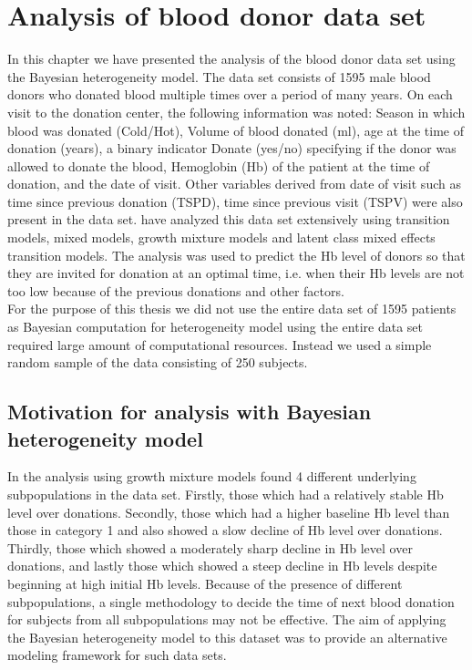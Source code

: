 
\chapter{Analysis of blood donor data set}
\label{ch : blood_donor}
 
 In this chapter we have presented the analysis of the blood donor data set \citep{nasserinejad_prevalence_2015} using the Bayesian heterogeneity model. The data set consists of 1595 male blood donors who donated blood multiple times over a period of many years. On each visit to the donation center, the following information was noted: Season in which blood was donated (Cold/Hot), Volume of blood donated (ml), age at the time of donation (years), a binary indicator Donate (yes/no) specifying if the donor was allowed to donate the blood, Hemoglobin (Hb) of the patient at the time of donation, and the date of visit. Other variables derived from date of visit such as time since previous donation (TSPD), time since previous visit (TSPV) were also present in the data set. \citet{nasserinejad_predicting_2013,nasserinejad_prevalence_2015,nasserinejad_prediction_2016} have analyzed this data set extensively using transition models, mixed models, growth mixture models and latent class mixed effects transition models. The analysis was used to predict the Hb level of donors so that they are invited for donation at an optimal time, i.e. when their Hb levels are not too low because of the previous donations and other factors.\\

 For the purpose of this thesis we did not use the entire data set of 1595 patients as Bayesian computation for heterogeneity model using the entire data set required large amount of computational resources. Instead we used a simple random sample of the data consisting of 250 subjects.

\section{Motivation for analysis with Bayesian heterogeneity model}
 In the analysis using growth mixture models \citet{nasserinejad_prevalence_2015} found 4 different underlying subpopulations in the data set. Firstly, those which had a relatively stable Hb level over donations. Secondly, those which had a higher baseline Hb level than those in category 1 and also showed a slow decline of Hb level over donations. Thirdly, those which showed a moderately sharp decline in Hb level over donations, and lastly those which showed a steep decline in Hb levels despite beginning at high initial Hb levels. Because of the presence of different subpopulations, a single methodology to decide the time of next blood donation for subjects from all subpopulations may not be effective. The aim of applying the Bayesian heterogeneity model to this dataset was to provide an alternative modeling framework for such data sets.

